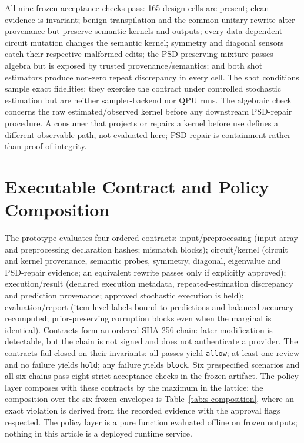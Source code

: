 \documentclass[10pt,journal,compsoc]{IEEEtran}
\begin{document}
All nine frozen acceptance checks pass: 165 design cells are present; clean evidence
is invariant; benign transpilation and the common-unitary rewrite alter
provenance but preserve semantic kernels and outputs; every data-dependent
circuit mutation changes the semantic kernel; symmetry and diagonal sensors
catch their respective malformed edits; the PSD-preserving mixture passes
algebra but is exposed by trusted provenance/semantics; and both shot
estimators produce non-zero repeat discrepancy in every cell. The shot
conditions sample exact fidelities: they exercise the contract under
controlled stochastic estimation but are neither sampler-backend nor QPU runs.
The algebraic check concerns the raw estimated/observed kernel before any
downstream PSD-repair procedure. A consumer that projects or repairs a kernel
before use defines a different observable path, not evaluated here; PSD repair
is containment rather than proof of integrity.

\section{Executable Contract and Policy Composition}

The prototype evaluates four ordered contracts: input/preprocessing (input
array and preprocessing declaration hashes; mismatch blocks); circuit/kernel
(circuit and kernel provenance, semantic probes, symmetry, diagonal,
eigenvalue and PSD-repair evidence; an equivalent rewrite passes only if
explicitly approved); execution/result (declared execution metadata,
repeated-estimation discrepancy and prediction provenance; approved
stochastic execution is held); evaluation/report (item-level labels bound to
predictions and balanced accuracy recomputed; prior-preserving corruption
blocks even when the marginal is identical). Contracts form an ordered
SHA-256 chain: later modification is detectable, but the chain is not signed
and does not authenticate a provider. The contracts fail closed on their
invariants: all passes yield \texttt{allow}; at least one review and no
failure yields \texttt{hold}; any failure yields \texttt{block}. Six
prespecified scenarios and all six chains pass eight strict acceptance checks
in the frozen artifact. The policy layer composes with these contracts by the
maximum in the lattice; the composition over the six frozen envelopes is
Table~\ref{tab:s-composition}, where an exact violation is derived from the
recorded evidence with the approval flags respected. The policy layer is a
pure function evaluated offline on frozen outputs; nothing in this article is
a deployed runtime service.
\end{document}
